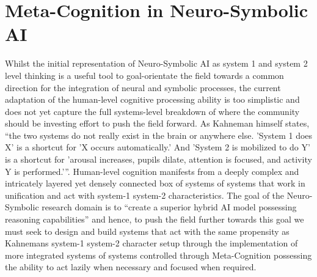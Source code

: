 \documentclass[hf]{ceurart}
\begin{document}
\section{Meta-Cognition in Neuro-Symbolic AI}
Whilst the initial representation of Neuro-Symbolic AI as system 1 and system 2 level thinking is a useful tool to goal-orientate the field towards a common direction for the integration of neural and symbolic processes, the current adaptation of the human-level cognitive processing ability is too simplistic and does not yet capture the full systems-level breakdown of where the community should be investing effort to push the field forward. As Kahneman himself states, \enquote{the two systems do not really exist in the brain or anywhere else. 'System 1 does X' is a shortcut for 'X occurs automatically.' And 'System 2 is mobilized to do Y' is a shortcut for 'arousal increases, pupils dilate, attention is focused, and activity Y is performed.'}. Human-level cognition manifests from a deeply complex and intricately layered yet densely connected box of systems of systems that work in unification and act with system-1 system-2 characteristics. The goal of the Neuro-Symbolic research domain is to \enquote{create a superior hybrid AI model possessing reasoning capabilities} and hence, to push the field further towards this goal we must seek to design and build systems that act with the same propensity as Kahnemans system-1 system-2 character setup through the implementation of more integrated systems of systems controlled through Meta-Cognition possessing the ability to act lazily when necessary and focused when required. 
\end{document}
